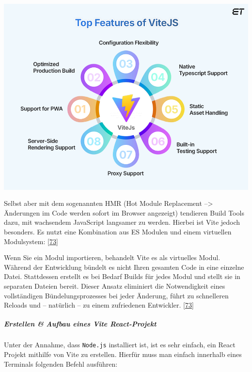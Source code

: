 \documentclass[
    headings=optiontotocandhead,%
    twoside,
    numbers=noenddot,%
    12pt, %
    titlepage, %
    parskip=full, %
    listof=leveldown, 
    numbers=noenddot, %
    a4paper,DIV=14,
    BCOR=15mm,
]{scrbook}
\newcommand{\passthrough}[1]{#1}
\let\origfigure=\figure
\let\endorigfigure=\endfigure
\renewenvironment{figure}[1][]{%
   \origfigure[H]
}{%
   \endorigfigure
}
\renewenvironment{quote}{\begin{customblockquote}\list{}{\rightmargin=0em\leftmargin=0em}%
\item\relax\color{blockquote-text}\ignorespaces}{\unskip\unskip\endlist\end{customblockquote}}
\begin{document}
\begin{figure}
\centering
\includegraphics[width=1\textwidth,height=\textheight]{img/Gekle/Vite-Features.png}
\caption{Funktionen von Vite
\protect\hyperlink{ref-eluminoustechnologies-vite}{72}}
\end{figure}

Selbst aber mit dem sogenannten HMR (Hot Module Replacement
--\textgreater{} Änderungen im Code werden sofort im Browser angezeigt)
tendieren Build Tools dazu, mit wachsendem JavaScript langsamer zu
werden. Hierbei ist Vite jedoch besonders. Es nutzt eine Kombination aus
ES Modulen und einem virtuellen Modulsystem:
{[}\protect\hyperlink{ref-Telerik-BuildTools}{73}{]}

\begin{quote}
Wenn Sie ein Modul importieren, behandelt Vite es als virtuelles Modul.
Während der Entwicklung bündelt es nicht Ihren gesamten Code in eine
einzelne Datei. Stattdessen erstellt es bei Bedarf Builds für jedes
Modul und stellt sie in separaten Dateien bereit. Dieser Ansatz
eliminiert die Notwendigkeit eines vollständigen Bündelungsprozesses bei
jeder Änderung, führt zu schnelleren Reloads und -- natürlich -- zu
einem zufriedenen Entwickler.
{[}\protect\hyperlink{ref-Telerik-BuildTools}{73}{]}
\end{quote}

\hypertarget{erstellen-aufbau-eines-vite-react-projekt}{%
\subparagraph{Erstellen \& Aufbau eines Vite
React-Projekt}\label{erstellen-aufbau-eines-vite-react-projekt}}

Unter der Annahme, dass \passthrough{\lstinline!Node.js!} installiert
ist, ist es sehr einfach, ein React Projekt mithilfe von Vite zu
erstellen. Hierfür muss man einfach innerhalb eines Terminals folgenden
Befehl ausführen:
\end{document}

